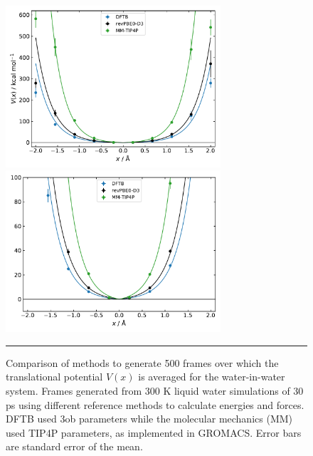 \documentclass[../main.tex]{subfiles}
\begin{document}
\begin{figure}[h!]
	\centering
	\begin{minipage}[b]{0.49\textwidth}
		\includegraphics[width=8cm]{4/figs/figX3/xtb_wells.pdf}
	\end{minipage}
	\hfill
	\begin{minipage}[b]{0.49\textwidth}
		\includegraphics[width=8cm]{4/figs/figX3/xtb_wells_zoom.pdf}
	\end{minipage}
	\vspace{0.2cm}
	\hrule
	\caption{Comparison of methods to generate 500 frames over which the translational potential $V(x)$ is averaged for the water-in-water system. Frames generated from 300 K liquid water simulations of 30 ps using different reference methods to calculate energies and forces. DFTB used 3ob parameters while the molecular mechanics (MM) used TIP4P parameters, as implemented in GROMACS. Error bars are standard error of the mean.}
	\label{fig::entropy_X3c}
\end{figure}

\end{document}
